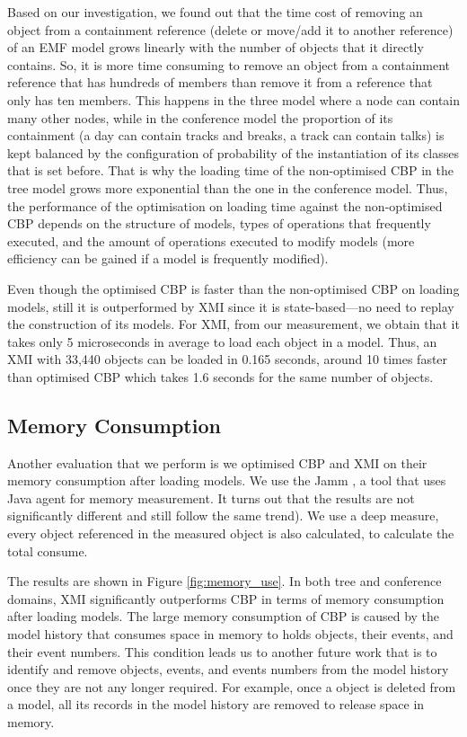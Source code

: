 \documentclass{llncs}
\begin{document}
Based on our investigation, we found out that the time cost of removing an object from a containment reference (delete or move/add it to another reference) of an EMF model grows linearly with the number of objects that it directly contains. So, it is more time consuming to remove an object from a containment reference that has hundreds of members than remove it from a reference that only has ten members. This happens in the three model where a node can contain many other nodes, while in the conference model the proportion of its containment (a day can contain tracks and breaks, a track can contain talks) is kept balanced by the configuration of probability of the instantiation of its classes that is set before. That is why the loading time of the non-optimised CBP in the tree model grows more exponential than the one in the conference model. Thus, the performance of the optimisation on loading time against the non-optimised CBP depends on the structure of models, types of operations that frequently executed, and the amount of operations executed to modify models (more efficiency can be gained if a model is frequently modified).       
         
Even though the optimised CBP is faster than the non-optimised CBP on loading models, still it is outperformed by XMI since it is state-based---no need to replay the construction of its models. For XMI, from our measurement, we obtain that it takes only 5 microseconds in average to load each object in a model. Thus, an XMI with 33,440 objects can be loaded in 0.165 seconds, around 10 times faster than optimised CBP which takes 1.6 seconds for the same number of objects. 

\subsection{Memory Consumption}
\label{subsec:memory_consumption}

Another evaluation that we perform is we optimised CBP and XMI on their memory consumption after loading models. We use the Jamm \cite{brosius2017jamm}, a tool that uses Java agent for memory measurement. It turns out that the results are not significantly different and still follow the same trend). We use a deep measure, every object referenced in the measured object is also calculated, to calculate the total consume. 

The results are shown in Figure \ref{fig:memory_use}. In both tree and conference domains, XMI significantly outperforms CBP in terms of memory consumption after loading models. The large memory consumption of CBP is caused by the model history that consumes space in memory to holds objects, their events, and their event numbers. This condition leads us to another future work that is to identify and remove objects, events, and events numbers from the model history once they are not any longer required. For example, once a object is deleted from a model, all its records in the model history are removed to release space in memory. 
\end{document}
